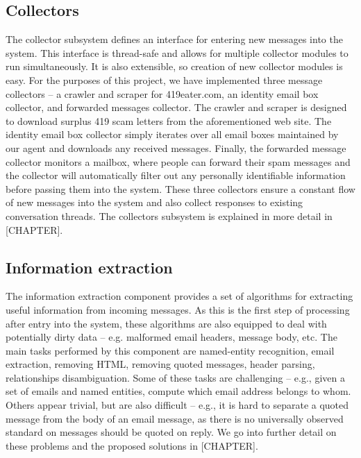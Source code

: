 \subsection*{Collectors}
The collector subsystem defines an interface for entering new messages into the system. This interface is thread-safe and allows for multiple collector modules to run simultaneously. It is also extensible, so creation of new collector modules is easy. For the purposes of this project, we have implemented three message collectors – a crawler and scraper for 419eater.com, an identity email box collector, and forwarded messages collector. The crawler and scraper is designed to download surplus 419 scam letters from the aforementioned web site. The identity email box collector simply iterates over all email boxes maintained by our agent and downloads any received messages. Finally, the forwarded message collector monitors a mailbox, where people can forward their spam messages and the collector will automatically filter out any personally identifiable information before passing them into the system. These three collectors ensure a constant flow of new messages into the system and also collect responses to existing conversation threads. The collectors subsystem is explained in more detail in [CHAPTER].

\subsection*{Information extraction}
The information extraction component provides a set of algorithms for extracting useful information from incoming messages. As this is the first step of processing after entry into the system, these algorithms are also equipped to deal with potentially dirty data – e.g. malformed email headers, message body, etc. The main tasks performed by this component are named-entity recognition, email extraction, removing HTML, removing quoted messages, header parsing, relationships disambiguation. Some of these tasks are challenging – e.g., given a set of emails and named entities, compute which email address belongs to whom. Others appear trivial, but are also difficult – e.g., it is hard to separate a quoted message from the body of an email message, as there is no universally observed standard on messages should be quoted on reply. We go into further detail on these problems and the proposed solutions in [CHAPTER].

